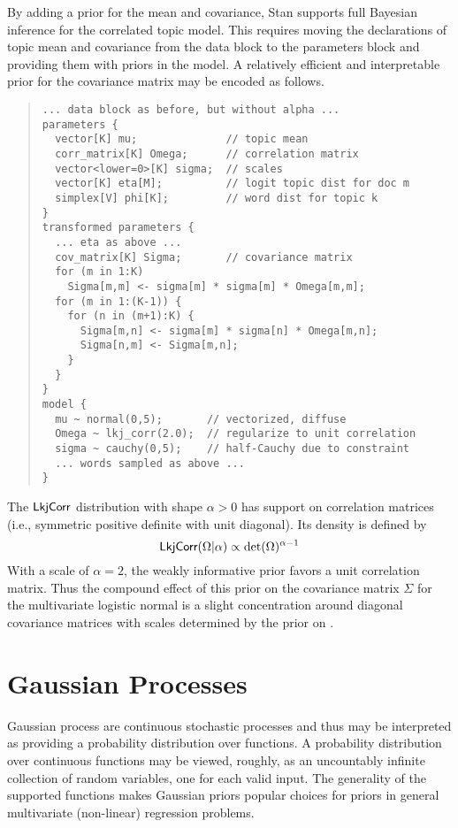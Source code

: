 By adding a prior for the mean and covariance, Stan supports full
Bayesian inference for the correlated topic model.  This requires
moving the declarations of topic mean  and covariance  
from the data block to the parameters block and providing them with
priors in the model.  A relatively efficient and interpretable prior
for the covariance matrix  may be encoded as follows.
%
\begin{quote}
\begin{Verbatim}[fontsize=\small]
... data block as before, but without alpha ...
parameters {
  vector[K] mu;              // topic mean
  corr_matrix[K] Omega;      // correlation matrix
  vector<lower=0>[K] sigma;  // scales
  vector[K] eta[M];          // logit topic dist for doc m
  simplex[V] phi[K];         // word dist for topic k
}
transformed parameters {
  ... eta as above ...
  cov_matrix[K] Sigma;       // covariance matrix
  for (m in 1:K)
    Sigma[m,m] <- sigma[m] * sigma[m] * Omega[m,m];
  for (m in 1:(K-1)) {
    for (n in (m+1):K) {
      Sigma[m,n] <- sigma[m] * sigma[n] * Omega[m,n];
      Sigma[n,m] <- Sigma[m,n];
    }
  }
}
model {
  mu ~ normal(0,5);       // vectorized, diffuse
  Omega ~ lkj_corr(2.0);  // regularize to unit correlation
  sigma ~ cauchy(0,5);    // half-Cauchy due to constraint
  ... words sampled as above ...
}
\end{Verbatim}
\end{quote}
%
The $\mbox{\sf LkjCorr}$ distribution with shape $\alpha > 0$ has support
on correlation matrices (i.e., symmetric positive definite with unit
diagonal).  Its density is defined by
\[
\mbox{\sf LkjCorr}(\Omega|\alpha) \propto \mbox{det}(\Omega)^{\alpha - 1}
\]
With a scale of $\alpha = 2$, the weakly informative prior favors a
unit correlation matrix.  Thus the compound effect of this prior on
the covariance matrix $\Sigma$ for the multivariate logistic normal is
a slight concentration around diagonal covariance matrices with scales
determined by the prior on .






\chapter{Gaussian Processes}\label{gaussian-processes.chapter}

\noindent
Gaussian process are continuous stochastic processes and thus may be
interpreted as providing a probability distribution over functions.  A
probability distribution over continuous functions may be viewed,
roughly, as an uncountably infinite collection of random variables,
one for each valid input.  The generality of the supported functions
makes Gaussian priors popular choices for priors in general
multivariate (non-linear) regression problems.

